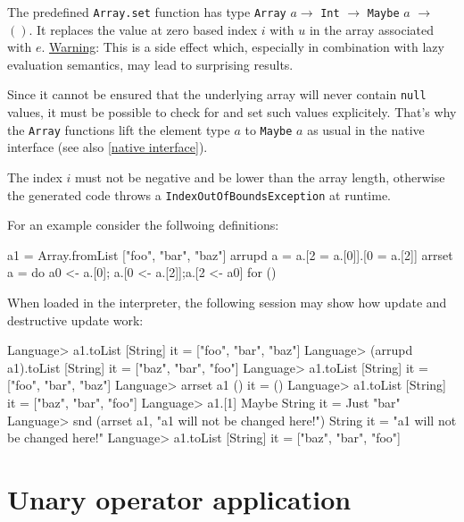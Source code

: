The predefined \texttt{Array.set} function has type \texttt{Array} $a \rightarrow$ \texttt{Int} $\rightarrow$ \texttt{Maybe} $a$ $\rightarrow$ $()$. It replaces the value at zero based index $i$ with $u$ in the \java{} array associated with $e$. \underline{Warning}: This is a side effect which, especially in combination with lazy evaluation semantics, may lead to surprising results.

Since it cannot be ensured that the underlying \java{} array will never contain \texttt{null} values, it must be possible to check for and set such values explicitely. That's why the \texttt{Array} functions lift the element type $a$ to \texttt{Maybe} $a$ as usual in the native interface (see also \autoref{native interface}).

The index $i$ must not be negative and be lower than the array length, otherwise the generated \java{} code throws a \texttt{IndexOutOfBoundsException} at runtime.

For an example consider the follwoing definitions:

\begin{code}
a1 = Array.fromList ["foo", "bar", "baz"]
arrupd a = a.[2 = a.[0]].[0 = a.[2]]
arrset a = do a0 <- a.[0]; a.[0 <- a.[2]];a.[2 <- a0] for ()
\end{code}

When loaded in the interpreter, the following session may show how update and destructive update work:

\begin{code}
Language> a1.toList
[String]
it = ["foo", "bar", "baz"]
Language> (arrupd a1).toList
[String]
it = ["baz", "bar", "foo"]
Language> a1.toList
[String]
it = ["foo", "bar", "baz"]
Language> arrset a1
()
it = ()
Language> a1.toList
[String]
it = ["baz", "bar", "foo"]
Language> a1.[1]
Maybe String
it = Just "bar"
Language> snd (arrset a1, "a1 will not be changed here!")
String
it = "a1 will not be changed here!"
Language> a1.toList
[String]
it = ["baz", "bar", "foo"]
\end{code}

\section{Unary operator application}

\begin{flushleft}
 
   \alt {} 
\end{flushleft}

